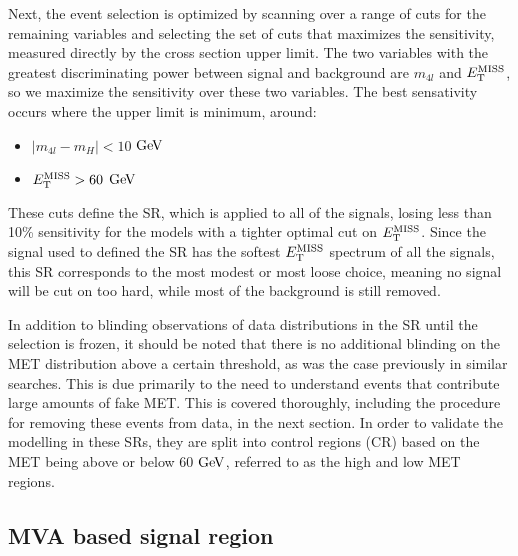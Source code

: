 Next, the event selection is optimized by scanning over a range of cuts for the remaining variables and selecting the set of cuts that maximizes the sensitivity, measured directly by the cross section upper limit. The two variables with the greatest discriminating power between signal and background are $m_{4l}$ and $E_{\rm{T}}^{\rm{MISS}}$, so we maximize the sensitivity over these two variables. The best sensativity occurs where the upper limit is minimum, around:

\begin{itemize}
\item $|m_{4l} - m_H| < 10$ $\mathrm{Ge\kern -0.1em V}$
\item $E_{\rm{T}}^{\rm{MISS}} > 60$ $\mathrm{Ge\kern -0.1em V}$
\end{itemize}

These cuts define the SR, which is applied to all of the signals, losing less than 10\% sensitivity for the models with a tighter optimal cut on $E_{\rm{T}}^{\rm{MISS}}$. Since the signal used to defined the SR has the softest $E_{\rm{T}}^{\rm{MISS}}$ spectrum of all the signals, this SR corresponds to the most modest or most loose choice, meaning no signal will be cut on too hard, while most of the background is still removed. 


In addition to blinding observations of data distributions in the SR until the selection is frozen, it should be noted that there is no additional blinding on the MET distribution above a certain threshold, as was the case previously in similar searches. This is due primarily to the need to understand events that contribute large amounts of fake MET. This is covered thoroughly, including the procedure for removing these events from data, in the next section. In order to validate the modelling in these SRs, they are split into control regions (CR) based on the MET being above or below 60 $\mathrm{Ge\kern -0.1em V}$, referred to as the high and low MET regions. 


\subsection{MVA based signal region} \label{mvaopt}

